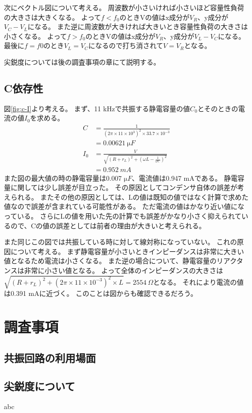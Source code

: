 \documentclass[11pt,a4paper,fleqn]{jsarticle}
\begin{document}
次にベクトル図について考える。
周波数が小さいければ小さいほど容量性負荷の大きさは大きくなる。
よって$f<f_{0}$のときVの値はx成分が$V_{R}$、y成分が$V_{C}-V_{L}$になる。
また逆に周波数が大きければ大きいとき容量性負荷の大きさは小さくなる。
よって$f>f_{0}$のときVの値はx成分が$V_{R}$、y成分が$V_{L}-V_{C}$になる。
最後に$f=f{0}$のとき$V_{L}=V_{C}$になるので打ち消されて$V=V_{R}$となる。

尖鋭度については後の調査事項の章にて説明する。

\subsection{C依存性}
図\ref{fig:c-I}より考える。
まず、11 kHzで共振する静電容量の値$C_{0}$とそのときの電流の値$I_{0}$を求める。
\begin{align}
C&=\frac{1}{(2\pi \times 11\times 10^{3})^2\times 33.7\times 10^{-3}}\\
&=0.00621\ \si{\micro F}\\
I_{0}&=\frac{V}{\sqrt{(R+r_{L})^2+(\omega L-\frac{1}{\omega C})^2}}\\
&=0.952\ \si{mA}
\end{align}
また図の最大値の時の静電容量は0.007 $\si{\micro F}$、電流値は0.947 mAである。
静電容量に関しては少し誤差が目立った。
その原因としてコンデンサ自体の誤差が考えられる。
またその他の原因としては、Lの値は既知の値ではなく計算で求めた値なので誤差が含まれている可能性がある。
ただ電流の値はかなり近い値になっている。
さらにLの値を用いた先の計算でも誤差がかなり小さく抑えられているので、Cの値の誤差としては前者の理由が大きいと考えられる。

また同じこの図では共振している時に対して線対称になっていない。
これの原因について考える。
まず静電容量が小さいときインピーダンスは非常に大きい値となるため電流は小さくなる。
また逆の場合について、静電容量のリアクタンスは非常に小さい値となる。
よって全体のインピーダンスの大きさは$\sqrt{(R+r_{L})^2+(2\pi \times 11\times 10^{-3})^2\times L}=2554\ \Omega$となる。
それにより電流の値は0.391 mAに近づく。
このことは図からも確認できるだろう。

\section{調査事項}
\subsection{共振回路の利用場面}

\subsection{尖鋭度について}
%
\begin{thebibliography}{99}
 abc
\end{thebibliography}
\end{document}
